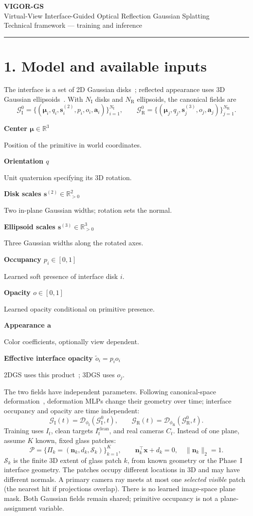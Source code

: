 \documentclass[10pt,a4paper]{article}
\newcommand{\notation}[2]{\noindent\textbf{#1}\par\nopagebreak #2\par}
\newcommand{\GI}{\mathcal G_{\mathrm I}}
\newcommand{\GR}{\mathcal G_{\mathrm R}}
\newcommand{\Def}{\mathcal D}
\newcommand{\notepair}[4]{\par\noindent
\begin{minipage}[t]{0.485\textwidth}\small\notation{#1}{#2}\end{minipage}\hfill
\begin{minipage}[t]{0.485\textwidth}\small\notation{#3}{#4}\end{minipage}\par\vspace{1pt}}
\begin{document}
\begin{center}
{\Large\bfseries VIGOR-GS}\\[2pt]
{\large Virtual-View Interface-Guided Optical Reflection Gaussian Splatting}\\[2pt]
{\footnotesize Technical framework --- training and inference}
\end{center}
\vspace{-1mm}\hrule\vspace{2mm}

\section*{1. Model and available inputs}
The interface is a set of 2D Gaussian disks~\cite{huang2024}; reflected appearance uses 3D Gaussian ellipsoids~\cite{kerbl2023}. With $N_{\mathrm I}$ disks and $N_{\mathrm R}$ ellipsoids, the canonical fields are
\begin{equation*}
\GI^0=\{(\boldsymbol\mu_i,q_i,\mathbf s_i^{(2)},p_i,o_i,\mathbf a_i)\}_{i=1}^{N_{\mathrm I}},
\qquad
\GR^0=\{(\boldsymbol\mu_j,q_j,\mathbf s_j^{(3)},o_j,\mathbf a_j)\}_{j=1}^{N_{\mathrm R}}.
\end{equation*}
\notepair{Center $\boldsymbol\mu\in\mathbb R^3$}{Position of the primitive in world coordinates.}
{Orientation $q$}{Unit quaternion specifying its 3D rotation.}
\notepair{Disk scales $\mathbf s^{(2)}\in\mathbb R_{>0}^{2}$}{Two in-plane Gaussian widths; rotation sets the normal.}
{Ellipsoid scales $\mathbf s^{(3)}\in\mathbb R_{>0}^{3}$}{Three Gaussian widths along the rotated axes.}
\notepair{Occupancy $p_i\in[0,1]$}{Learned soft presence of interface disk $i$.}
{Opacity $o\in[0,1]$}{Learned opacity conditional on primitive presence.}
\notepair{Appearance $\mathbf a$}{Color coefficients, optionally view dependent.}
{Effective interface opacity $\widetilde o_i=p_i o_i$}{2DGS uses this product~\cite{vigor}; 3DGS uses $o_j$.}
The two fields have independent parameters. Following canonical-space deformation~\cite{yang2024}, deformation MLPs change their geometry over time; interface occupancy and opacity are time independent:
\begin{equation}
\GI(t)=\Def_{\phi_{\mathrm I}}(\GI^0,t),
\qquad
\GR(t)=\Def_{\phi_{\mathrm R}}(\GR^0,t). \tag{1}
\end{equation}
Training uses $I_t$, clean targets $I_t^{\mathrm{clean}}$, and real cameras $C_t$.
Instead of one plane, assume $K$ known, fixed glass patches:
\begin{equation*}
\mathcal P=\{\Pi_k=(\mathbf n_k,d_k,\mathcal S_k)\}_{k=1}^{K},\qquad
\mathbf n_k^\top\mathbf x+d_k=0,\quad\|\mathbf n_k\|_2=1.
\end{equation*}
$\mathcal S_k$ is the finite 3D extent of glass patch $k$, from known geometry or the Phase~I interface geometry. The patches occupy different locations in 3D and may have different normals. A primary camera ray meets at most one \emph{selected visible} patch (the nearest hit if projections overlap). There is no learned image-space plane mask. Both Gaussian fields remain shared; primitive occupancy is not a plane-assignment variable.
\end{document}

